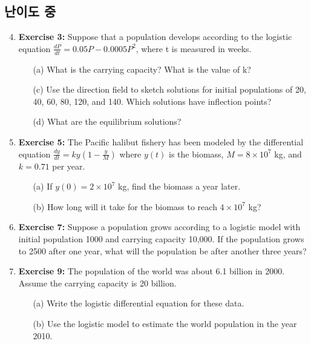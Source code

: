 \documentclass[12pt, a4paper]{article}
\begin{document}
\subsection*{난이도 중 }
\begin{enumerate}
    \setcounter{enumi}{3} %
    \item \textbf{Exercise 3:} Suppose that a population develops according to the logistic equation $\frac{dP}{dt} = 0.05P - 0.0005P^2$, where t is measured in weeks.
    \begin{itemize}
        \item[(a)] What is the carrying capacity? What is the value of k?
        \item[(c)] Use the direction field to sketch solutions for initial populations of 20, 40, 60, 80, 120, and 140. Which solutions have inflection points?
        \item[(d)] What are the equilibrium solutions?
    \end{itemize}

    \item \textbf{Exercise 5:} The Pacific halibut fishery has been modeled by the differential equation $\frac{dy}{dt} = ky(1 - \frac{y}{M})$ where $y(t)$ is the biomass, $M=8 \times 10^7$ kg, and $k=0.71$ per year.
    \begin{itemize}
        \item[(a)] If $y(0) = 2 \times 10^7$ kg, find the biomass a year later.
        \item[(b)] How long will it take for the biomass to reach $4 \times 10^7$ kg?
    \end{itemize}

    \item \textbf{Exercise 7:} Suppose a population grows according to a logistic model with initial population 1000 and carrying capacity 10,000. If the population grows to 2500 after one year, what will the population be after another three years?

    \item \textbf{Exercise 9:} The population of the world was about 6.1 billion in 2000. Assume the carrying capacity is 20 billion.
    \begin{itemize}
        \item[(a)] Write the logistic differential equation for these data.
        \item[(b)] Use the logistic model to estimate the world population in the year 2010.
    \end{itemize}
    

\end{enumerate}
\end{document}
